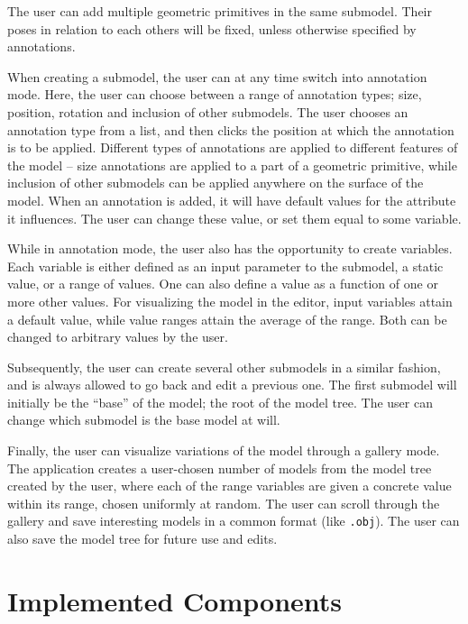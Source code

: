 \documentclass[english]{article}
\begin{document}
The user can add multiple geometric primitives in the same submodel. Their poses in relation to each others will be fixed, unless otherwise specified by annotations.


When creating a submodel, the user can at any time switch into annotation mode. Here, the user can choose between a range of annotation types; size, position, rotation and inclusion of other submodels. The user chooses an annotation type from a list, and then clicks the position at which the annotation is to be applied. Different types of annotations are applied to different features of the model -- size annotations are applied to a part of a geometric primitive, while inclusion of other submodels can be applied anywhere on the surface of the model. When an annotation is added, it will have default values for the attribute it influences. The user can change these value, or set them equal to some variable.

While in annotation mode, the user also has the opportunity to create variables. Each variable is either defined as an input parameter to the submodel, a static value, or a range of values. One can also define a value as a function of one or more other values. For visualizing the model in the editor, input variables attain a default value, while value ranges attain the average of the range. Both can be changed to arbitrary values by the user.

Subsequently, the user can create several other submodels in a similar fashion, and is always allowed to go back and edit a previous one. The first submodel will initially be the ``base'' of the model; the root of the model tree. The user can change which submodel is the base model at will.


Finally, the user can visualize variations of the model through a gallery mode. The application creates a user-chosen number of models from the model tree created by the user, where each of the range variables are given a concrete value within its range, chosen uniformly at random. The user can scroll through the gallery and save interesting models in a common format (like \texttt{.obj}). The user can also save the model tree for future use and edits.

\pagebreak

\section{Implemented Components} \label{section_components}
\end{document}

